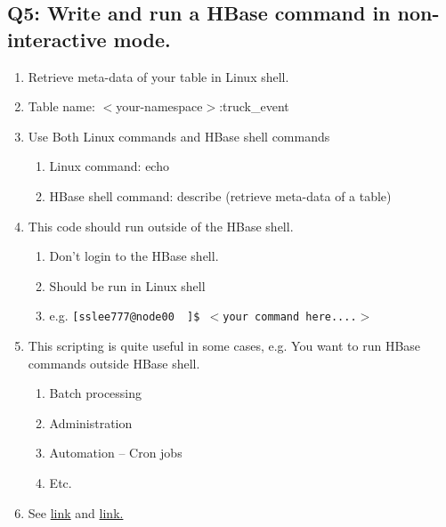 \documentclass[]{article}
\begin{document}
\subsection*{Q5: Write and run a HBase command in non-interactive mode.} 
\begin{enumerate}[before=\itshape,font=\normalfont,label=\alph*.]
	\item Retrieve meta-data of your table in Linux shell.
	\item Table name: $<$your-namespace$>$:truck\_event
	\item Use Both Linux commands and HBase shell commands
	\begin{enumerate}[label=\roman*.]
		\item Linux command: echo
		\item HBase shell command: describe (retrieve meta-data of a table)
	\end{enumerate}
	\item This code should run outside of the HBase shell.
	\begin{enumerate}[label=\roman*.]
		\item Don’t login to the HBase shell.
		\item Should be run in Linux shell
		\item e.g. \texttt{[sslee777@node00 ~]\$ $<$your command here....$>$}
	\end{enumerate}
	\item This scripting is quite useful in some cases, e.g. You want to run HBase commands outside HBase shell. 
	\begin{enumerate}[label=\roman*.]
		\item Batch processing
		\item Administration
		\item Automation – Cron jobs
		\item Etc.
	\end{enumerate}
	\item See \href{https://hbase.apache.org/book.html#_running_the_shell_in_non_interactive_mode}{link} and 
	\href{https://hbase.apache.org/book.html#hbase.shell.noninteractive}{link.}
\end{enumerate}
\end{document}
